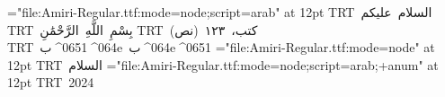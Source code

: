 \font\am="file:Amiri-Regular.ttf:mode=node;script=arab" at 12pt
\hbox{\am\textdir TRT السلام عليكم}
\hbox{\am\textdir TRT بِسْمِ اللَّهِ الرَّحْمَٰنِ}
\hbox{\am\textdir TRT كتب، ١٢٣ (نص)}
\hbox{\am\textdir TRT ب^^^^0651^^^^064e ب^^^^064e^^^^0651}
\font\amd="file:Amiri-Regular.ttf:mode=node" at 12pt
\hbox{\amd\textdir TRT السلام}
\font\amn="file:Amiri-Regular.ttf:mode=node;script=arab;+anum" at 12pt
\hbox{\amn\textdir TRT 2024}
